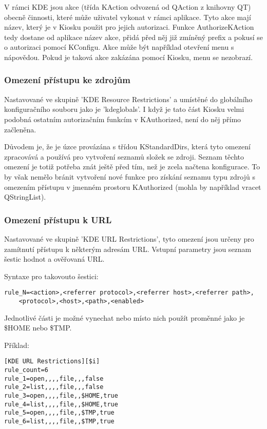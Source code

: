 V rámci KDE jsou akce (třída KAction odvozená od QAction z knihovny QT) obecně
činnosti, které může uživatel vykonat v rámci aplikace. Tyto akce mají název,
který je v Kiosku použit pro jejich autorizaci. Funkce AuthorizeKAction tedy
dostane od aplikace název akce, přidá před něj již zmíněný prefix a pokusí se
o autorizaci pomocí KConfigu.
Akce může být například otevření menu s nápovědou. Pokud je taková akce zakázána
pomocí Kiosku, menu se nezobrazí.

\subsubsection{Omezení přístupu ke zdrojům}
Nastavované ve skupině 'KDE Resource Restrictions' a umístěné do globálního
konfiguračního souboru jako je 'kdeglobals'.
I když je tato část Kiosku velmi podobná ostatním autorizačním funkcím
v KAuthorized, není do něj přímo začleněna.

Důvodem je, že je úzce provázána s třídou KStandardDirs, která tyto omezení
zpracovává a používá pro vytvoření seznamů složek se zdroji. Seznam těchto
omezení je totiž potřeba znát ještě před tím, než je zcela načtena konfigurace.
To by však nemělo bránit vytvoření nové funkce pro získání seznamu typu zdrojů
s omezením přístupu v jmenném prostoru KAuthorized (mohla by například vracet
QStringList).

\subsubsection{Omezení přístupu k URL}
Nastavované ve skupině 'KDE URL Restrictions', tyto omezení jsou určeny
pro zamítnutí přístupu k některým adresám URL. Vstupní parametry jsou seznam
šestic hodnot a ověřovaná URL.

Syntaxe pro takovouto šestici:
\begin{verbatim}
rule_N=<action>,<referrer protocol>,<referrer host>,<referrer path>,
    <protocol>,<host>,<path>,<enabled>
\end{verbatim}

Jednotlivé části je možné vynechat nebo místo nich použít proměnné jako
je \$HOME nebo \$TMP.

Příklad:
\begin{verbatim}
[KDE URL Restrictions][$i]
rule_count=6
rule_1=open,,,,file,,,false
rule_2=list,,,,file,,,false
rule_3=open,,,,file,,$HOME,true
rule_4=list,,,,file,,$HOME,true
rule_5=open,,,,file,,$TMP,true
rule_6=list,,,,file,,$TMP,true
\end{verbatim}

